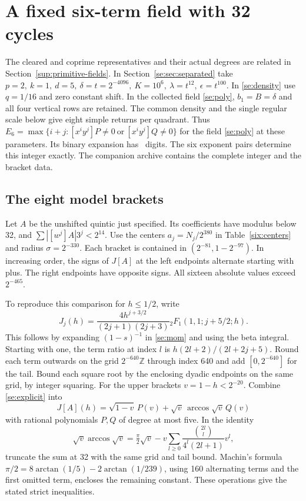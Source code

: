 \section{A fixed six-term field with 32 cycles}\label{six:fixed}
The cleared and coprime representatives and their actual degrees are related in Section~\ref{sup:primitive-fields}.
In Section~\ref{se:sec:separated} take \(p=2,\ k=1,\ d=5,\ \delta=t=2^{-4096},\ K=10^6,\ \lambda=t^{12},\ \epsilon=t^{100}\). In \eqref{se:density} use \(q=1/16\) and zero constant shift. In the collected field \eqref{se:poly}, \(b_1=B=\delta\) and all four vertical rows are retained. The common density and the single regular scale below give eight simple returns per quadrant. Thus \(E_6=\max\{i+j:[x^iy^j]P\ne0\ \text{or}\ [x^iy^j]Q\ne0\}\) for the field \eqref{se:poly} at these parameters. Its binary expansion has \unskip\ digits. The six exponent pairs determine this integer exactly. The companion archive \cite{LuReplay} contains the complete integer and the bracket data.
\subsection{The eight model brackets}
Let \(A\) be the unshifted quintic just specified. Its coefficients have
modulus below 32, and \(\sum |[w^j]A|3^j<2^{14}\).
Use the centers \(a_j=N_j/2^{380}\) in Table~\ref{six:centers} and radius
\(\sigma=2^{-330}\). Each bracket is contained in
\((2^{-81},1-2^{-97})\). In increasing order, the signs of \(J[A]\) at
the left endpoints alternate starting with plus. The right endpoints
have opposite signs. All sixteen absolute values exceed \(2^{-465}\).

To reproduce this comparison for \(h\le1/2\), write
\[
 J_j(h)=\frac{4h^{j+3/2}}{(2j+1)(2j+3)}
 {}_2F_1(1,1;j+5/2;h).
\]
This follows by expanding \((1-s)^{-1}\) in \eqref{se:mom} and using the
beta integral. Starting with one, the term ratio at index \(l\) is
\(h(2l+2)/(2l+2j+5)\). Round each term outwards on the grid
\(2^{-640}\mathbb Z\) through index 640 and add \([0,2^{-640}]\) for the
tail. Bound each square root by the enclosing dyadic endpoints on the
same grid, by integer squaring. For the upper brackets \(v=1-h<2^{-20}\).
Combine \eqref{se:explicit} into
\[
 J[A](h)=\sqrt{1-v}\,P(v)+\sqrt v\,\arccos\sqrt v\,Q(v)
\]
with rational polynomials \(P,Q\) of degree at most five. In the identity
\[
 \sqrt v\arccos\sqrt v=\tfrac{\pi}{2}\sqrt v-
       v\sum_{l\ge0}\frac{\binom{2l}{l}}{4^l(2l+1)}v^l,
\]
truncate the sum at 32 with the same grid and tail bound.
Machin's formula \(\pi/2=8\arctan(1/5)-2\arctan(1/239)\), using
160 alternating terms and the first omitted term, encloses the remaining
constant. These operations give the stated strict inequalities.

